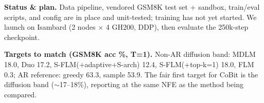 \documentclass[10pt]{article}
\begin{document}
\textbf{Status \& plan.} Data pipeline, vendored GSM8K test set + sandbox, train/eval scripts, and config are
in place and unit-tested; training has not yet started. We launch on Isambard (2 nodes $\times$ 4 GH200, DDP),
then evaluate the 250k-step checkpoint.

\vspace{1pt}
{\footnotesize\textbf{Targets to match (GSM8K acc \%, T{=}1).} Non-AR diffusion band: MDLM 18.0, Duo 17.2,
S-FLM(+adaptive+S-arch) 12.4, S-FLM(+top-k=1) 18.0, FLM 0.3; AR reference: greedy 63.3, sample 53.9.
The fair first target for CoBit is the diffusion band ($\sim$17--18\%), reporting at the same NFE as the
method being compared.}
\end{document}
